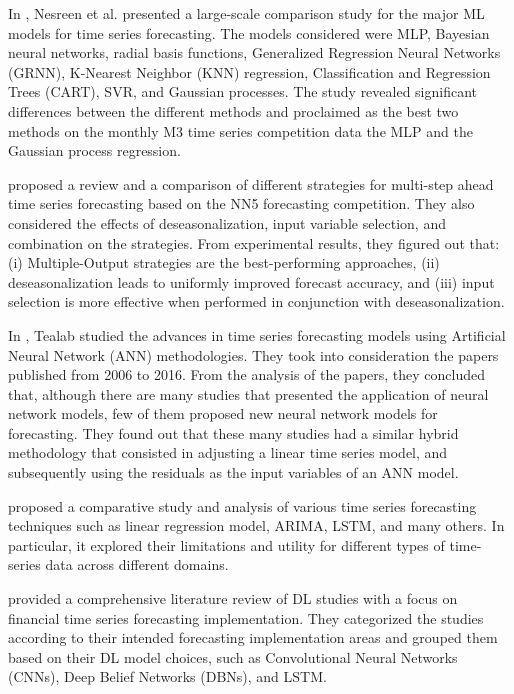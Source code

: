 In \cite{Nesreen2010}, Nesreen et al. presented a large-scale comparison study for the major ML models for time series forecasting.
The models considered were MLP, Bayesian neural networks, radial basis functions, Generalized Regression Neural Networks (GRNN), K-Nearest Neighbor (KNN) regression, Classification and Regression Trees (CART), SVR, and Gaussian processes.
The study revealed significant differences between the different methods and proclaimed as the best two methods on the monthly M3 time series competition data the MLP and the Gaussian process regression.

\cite{BENTAIEB20127067} proposed a review and a comparison of different strategies for multi-step ahead time series forecasting based on the NN5 forecasting competition.
They also considered the effects of deseasonalization, input variable selection, and combination on the strategies.
From experimental results, they figured out that:
(i) Multiple-Output strategies are the best-performing approaches,
(ii) deseasonalization leads to uniformly improved forecast accuracy,
and (iii) input selection is more effective when performed in conjunction with deseasonalization.

In \cite{TEALAB2018334}, Tealab studied the advances in time series forecasting models using Artificial Neural Network (ANN) methodologies.
They took into consideration the papers published from 2006 to 2016.
From the analysis of the papers, they concluded that, although there are many studies that presented the application of neural network models, few of them proposed new neural network models for forecasting.
They found out that these many studies had a similar hybrid methodology that consisted in adjusting a linear time series model, and subsequently using the residuals as the input variables of an ANN model.

\cite{Athiyarath2020} proposed a comparative study and analysis of various time series forecasting techniques such as linear regression model, ARIMA, LSTM, and many others.
In particular, it explored their limitations and utility for different types of time-series data across different domains.

\cite{SEZER2020106181} provided a comprehensive literature review of DL studies with a focus on financial time series forecasting implementation.
They categorized the studies according to their intended forecasting implementation areas and grouped them based on their DL model choices, such as Convolutional Neural Networks (CNNs), Deep Belief Networks (DBNs), and LSTM.

